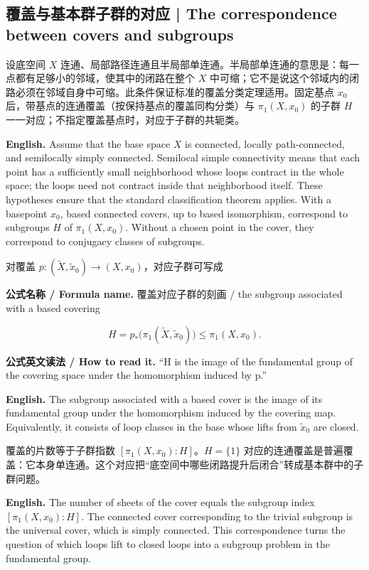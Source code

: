 \documentclass[UTF8,11pt,a4paper]{ctexart}
\newcommand{\EN}[1]{\par\noindent\textbf{English.} #1\par}
\newcommand{\READ}[1]{\par\noindent\textbf{公式英文读法 / How to read it.} #1\par}
\newcommand{\FORMULA}[2]{\par\noindent\textbf{公式名称 / Formula name.} #1 / #2\par}
\begin{document}
\subsection{覆盖与基本群子群的对应 | The correspondence between covers and subgroups}
\noindent 设底空间 $X$ 连通、局部路径连通且半局部单连通。半局部单连通的意思是：每一点都有足够小的邻域，使其中的闭路在整个 $X$ 中可缩；它不是说这个邻域内的闭路必须在邻域自身中可缩。此条件保证标准的覆盖分类定理适用。固定基点 $x_0$ 后，带基点的连通覆盖（按保持基点的覆盖同构分类）与 $\pi_1(X,x_0)$ 的子群 $H$ 一一对应；不指定覆盖基点时，对应于子群的共轭类。
\EN{Assume that the base space $X$ is connected, locally path-connected, and semilocally simply connected. Semilocal simple connectivity means that each point has a sufficiently small neighborhood whose loops contract in the whole space; the loops need not contract inside that neighborhood itself. These hypotheses ensure that the standard classification theorem applies. With a basepoint $x_0$, based connected covers, up to based isomorphism, correspond to subgroups $H$ of $\pi_1(X,x_0)$. Without a chosen point in the cover, they correspond to conjugacy classes of subgroups.}
\noindent 对覆盖 $p:(\widetilde X,\widetilde x_0)\to(X,x_0)$，对应子群可写成
\FORMULA{覆盖对应子群的刻画}{the subgroup associated with a based covering}
\[
H=p_*\bigl(\pi_1(\widetilde X,\widetilde x_0)\bigr)\le\pi_1(X,x_0).
\]
\READ{“H is the image of the fundamental group of the covering space under the homomorphism induced by p.”}
\EN{The subgroup associated with a based cover is the image of its fundamental group under the homomorphism induced by the covering map. Equivalently, it consists of loop classes in the base whose lifts from $\widetilde x_0$ are closed.}
\noindent 覆盖的片数等于子群指数 $[\pi_1(X,x_0):H]$。$H=\{1\}$ 对应的连通覆盖是普遍覆盖：它本身单连通。这个对应把“底空间中哪些闭路提升后闭合”转成基本群中的子群问题。
\EN{The number of sheets of the cover equals the subgroup index $[\pi_1(X,x_0):H]$. The connected cover corresponding to the trivial subgroup is the universal cover, which is simply connected. This correspondence turns the question of which loops lift to closed loops into a subgroup problem in the fundamental group.}
\end{document}

